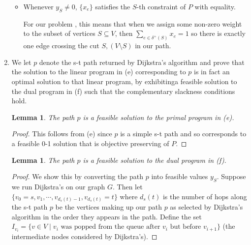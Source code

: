 \documentclass[12pt]{exam}
\newtheorem{lemma}[theorem]{Lemma}
\begin{document}
\begin{questions}
\begin{solution}
\begin{enumerate}[label=(\alph*)]
\begin{itemize}
          \item Whenever $y_S \neq 0$, $\{x_e\}$ satisfies the $S$-th constraint of $P$ with equality.

            For our problem , this means that when we assign some non-zero weight to the subset of vertices $S \subseteq V$, then $\sum_{e \in \delta^+(S)} x_e = 1$ so there is exactly one edge crossing the cut $S,(V\setminus S)$ in our path.
        \end{itemize}

        \item
          We let $p$ denote  the s-t path returned  by  Dijkstra’s  algorithm and prove  that  the  solution  to  the  linear program in (e) corresponding to $p$ is in fact an optimal solution to that linear program, by exhibitinga feasible solution to the dual program in (f) such that the complementary slackness conditions hold.

      \begin{lemma}
        The path $p$ is a feasible solution to the primal program in (e).
      \end{lemma}
      \begin{proof}
        This follows from (e) since $p$ is a simple s-t path and so corresponds to a feasible 0-1 solution that is objective preserving of $P$.
      \end{proof}

      \begin{lemma}
        The path $p$ is a feasible solution to the dual program in (f).
      \end{lemma}
      \begin{proof}
        We show this by converting the path $p$ into feasible values $y_S$. Suppose we run Dijkstra's on our graph $G$. Then let $\{v_0 = s, v_1, \cdots, v_{d_s(t) - 1}, v_{d_s(t)} = t\}$ where $d_s(t)$ is the number of hops along the s-t path $p$ be the vertices making up our path $p$ as selected by Dijkstra's algorithm in the order they appears in the path. Define the set $I_{v_i} = \{ v \in V \mid v_i \text{ was popped from the queue after } v_i \text{ but before } v_{i+1}\}$ (the intermediate nodes considered by Dijkstra's).


\end{proof}
\end{enumerate}
\end{solution}
\end{questions}
\end{document}
